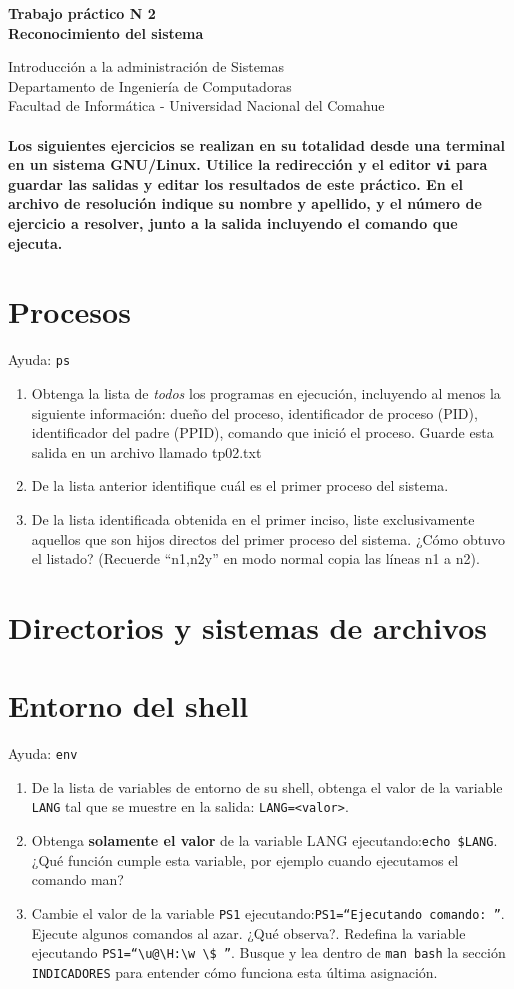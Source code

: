 \documentclass[12pt]{article}
\def\maketitle{

 \makeatletter
 {\color{bl} \centering \huge \sc \textbf{
Trabajo práctico N 2 \\
\large \vspace*{-8pt} \color{black} Reconocimiento del sistema
 \vspace*{8pt} }\par}
 \makeatother


 \makeatletter
 {\centering \small 
	Introducción a la administración de Sistemas \\
 	Departamento de Ingeniería de Computadoras \\
 	Facultad de Informática - Universidad Nacional del Comahue \\
 	\vspace{20pt} }
 \makeatother

}
\begin{document}
\thispagestyle{empty}
\maketitle
\setlength{\parindent}{0pt}

\paragraph{Los siguientes ejercicios se realizan en su totalidad desde una terminal en un sistema GNU/Linux. Utilice la redirección y el editor \texttt{vi} para guardar las salidas y editar los resultados de este práctico. En el archivo de resolución indique su nombre y apellido, y el número de ejercicio a resolver, junto a la salida incluyendo el comando que ejecuta. }

\section*{Procesos}
Ayuda: \texttt{ps}
\begin{enumerate}
\item Obtenga la lista de \textit{todos} los programas en ejecución, incluyendo al menos la siguiente información: dueño del proceso, identificador de proceso (PID), identificador del padre (PPID), comando que inició el proceso. Guarde esta salida en un archivo llamado tp02.txt 
\item De la lista anterior identifique cuál es el primer proceso del sistema.
\item De la lista identificada obtenida en el primer inciso, liste exclusivamente aquellos que son hijos directos del primer proceso del sistema. ¿Cómo obtuvo el listado? (Recuerde ``n1,n2y'' en modo normal copia las líneas n1 a n2).
\end{enumerate}

\section*{Directorios y sistemas de archivos}

\section*{Entorno del shell}
Ayuda: \texttt{env}
\begin{enumerate}
\item De la lista de variables de entorno de su shell, obtenga el valor de la variable \texttt{LANG} tal que se muestre en la salida: \texttt{LANG=<valor>}. 

\item Obtenga \textbf{solamente el valor} de la variable LANG ejecutando:\texttt{echo \$LANG}. ¿Qué función cumple esta variable, por ejemplo cuando ejecutamos el comando man? 
\item Cambie el valor de la variable \texttt{PS1} ejecutando:\texttt{PS1=``Ejecutando comando: ''}. Ejecute algunos comandos al azar. ¿Qué observa?. Redefina la variable ejecutando \texttt{PS1=``\textbackslash u@\textbackslash H:\textbackslash w \textbackslash \$ ''}. Busque y lea dentro de \texttt{man bash} la sección \texttt{INDICADORES} para entender cómo funciona esta última asignación.
\end{enumerate}
\end{document}
